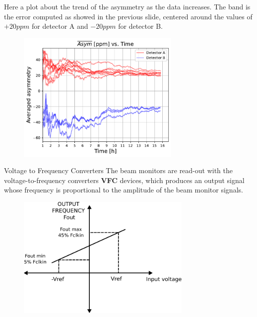 \documentclass[9pt,a4paper]{beamer}
\begin{document}
\begin{frame}[noframenumbering]

Here a plot about the trend of the asymmetry as the data increases. The band is the error computed as showed in the previous slide, centered around the values of $+20ppm$ for detector A and $-20ppm$ for detector B.

\begin{figure}[hbtp]
\centering
\includegraphics[width = 0.70\textwidth]{figures/AveragedAsymmetry.pdf}
\end{figure}
\end{frame}

\begin{frame}[noframenumbering]{Voltage to Frequency Converters}
The beam monitors are read-out with the voltage-to-frequency converters \textbf{VFC} devices, which produces an output signal whose frequency is proportional to the amplitude of the beam monitor signals. 
\begin{figure}
\includegraphics[width = 0.75\textwidth]{figures/Vfc.pdf}
\end{figure}
\end{frame}
\end{document}
